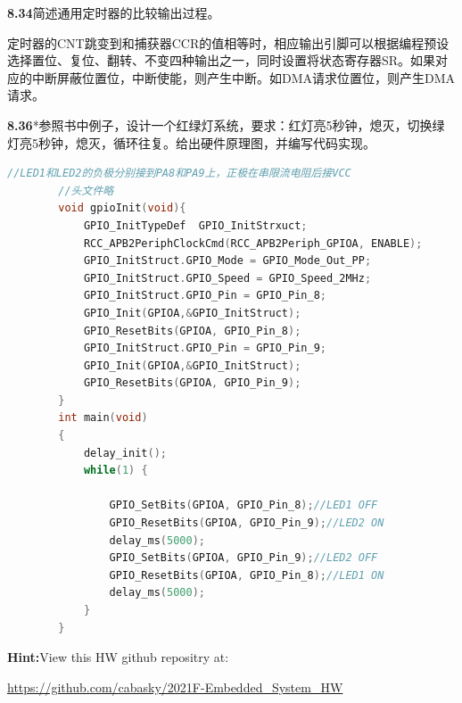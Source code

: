 \documentclass{article}
\begin{document}
    \noindent\textbf{8.34}简述通用定时器的比较输出过程。\par
    定时器的CNT跳变到和捕获器CCR的值相等时，相应输出引脚可以根据编程预设选择置位、复位、翻转、不变四种输出之一，同时设置将状态寄存器SR。如果对应的中断屏蔽位置位，中断使能，则产生中断。如DMA请求位置位，则产生DMA请求。
    \\[4pt]\par

    \noindent\textbf{8.36}*参照书中例子，设计一个红绿灯系统，要求：红灯亮5秒钟，熄灭，切换绿灯亮5秒钟，熄灭，循环往复。给出硬件原理图，并编写代码实现。\par
    \begin{lstlisting}[language=C]
        //LED1和LED2的负极分别接到PA8和PA9上，正极在串限流电阻后接VCC
        //头文件略
        void gpioInit(void){
            GPIO_InitTypeDef  GPIO_InitStrxuct;
            RCC_APB2PeriphClockCmd(RCC_APB2Periph_GPIOA, ENABLE);
            GPIO_InitStruct.GPIO_Mode = GPIO_Mode_Out_PP;
            GPIO_InitStruct.GPIO_Speed = GPIO_Speed_2MHz;
            GPIO_InitStruct.GPIO_Pin = GPIO_Pin_8;
            GPIO_Init(GPIOA,&GPIO_InitStruct);
            GPIO_ResetBits(GPIOA, GPIO_Pin_8);
            GPIO_InitStruct.GPIO_Pin = GPIO_Pin_9;
            GPIO_Init(GPIOA,&GPIO_InitStruct);
            GPIO_ResetBits(GPIOA, GPIO_Pin_9);
        }
        int main(void)
        {
            delay_init();
            while(1) {
    
                GPIO_SetBits(GPIOA, GPIO_Pin_8);//LED1 OFF
                GPIO_ResetBits(GPIOA, GPIO_Pin_9);//LED2 ON
                delay_ms(5000);
                GPIO_SetBits(GPIOA, GPIO_Pin_9);//LED2 OFF
                GPIO_ResetBits(GPIOA, GPIO_Pin_8);//LED1 ON
                delay_ms(5000);
            }
        }

    \end{lstlisting}

    \noindent\textbf{Hint:}\quad View this HW github repositry at:\par
    \quad \url{https://github.com/cabasky/2021F-Embedded_System_HW}
    \\[4pt]\par
\end{document}
